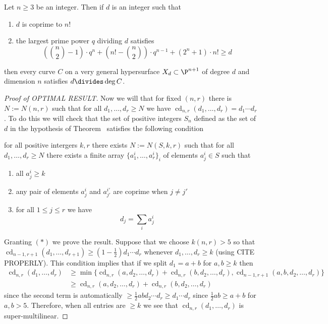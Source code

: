 \documentclass[12pt]{article}
\DeclareMathOperator{\cd}{\text{cd}}
\begin{document}
\begin{theorem} %
Let $n \ge 3$ be an integer. Then if $d$ is an integer such that
\begin{enumerate}
\item $d$ is coprime to $n!$
\item the largest prime power $q$ dividing $d$ satisfies
\[ \left( { n \choose 2} - 1 \right) \cdot q^n + \left( n! - {n \choose 2} \right) \cdot q^{n-1} + (2^n + 1) \cdot n! \ge d \]
\end{enumerate}
then every curve $C$ on a very general hypersurface $X_d \subset \P^{n+1}$ of degree $d$ and dimension $n$ satisfies $d \divides \deg{C}$.
\end{theorem}


\begin{proof}[Proof of OPTIMAL RESULT]
Now we will that for fixed $(n,r)$ there is $N := N(n,r)$ such that for all $d_1, \dots, d_r \ge N$ we have $\cd_{n,r}(d_1, \dots, d_r) = d_1 \cdots d_r$. To do this we will check that the set of positive integers $S_n$ defined as the set of $d$ in the hypothesis of Theorem~\label{thm:paulson} satisfies the following condition
\begin{center}
for all positive intergers $k,r$ there exists $N := N(S,k,r)$ such that for all $d_1, \dots, d_r \ge N$ there exists a finite array $\{ a_1^i, \dots, a_r^i \}_{i}$ of elements $a_j^i \in S$ such that
\begin{enumerate}
\item all $a^i_j \ge k$
\item any pair of elements $a^i_j$ and $a^{i'}_{j'}$ are coprime when $j \neq j'$
\item for all $1 \le j \le r$ we have
\[ d_j = \sum_i a^i_j \]
\end{enumerate}
\end{center}
Granting $(\ast)$ we prove the result. Suppose that we choose $k(n,r) > 5$ so that $\cd_{n-1,r+1}(d_1, \dots, d_{r+1}) \ge (1 - \tfrac{1}{2}) d_1 \cdots d_r$ whenever $d_1, \dots, d_r \ge k$ (using CITE PROPERLY). This condition implies that if we split $d_1 = a + b$ for $a,b \ge k$ then 
\begin{align*}
\cd_{n,r}(d_1, \dots, d_r) & \ge \min \{ \cd_{n,r}(a, d_2, \dots, d_r) + \cd_{n,r}(b, d_2, \dots, d_r), \cd_{n-1, r+1}(a,b, d_2, \dots, d_r) \} 
\\
& \ge \cd_{n,r}(a, d_2, \dots, d_r) + \cd_{n,r}(b, d_2, \dots, d_r)
\end{align*}
since the second term is automatically $\ge \tfrac{1}{2} ab d_2 \cdots d_r \ge d_1 \cdots d_r$ since $\tfrac{1}{2} ab \ge a + b$ for $a,b > 5$. Therefore, when all entries are $\ge k$ we see that $\cd_{n,r}(d_1, \dots, d_r)$ is super-multilinear.

\end{proof}
\end{document}
